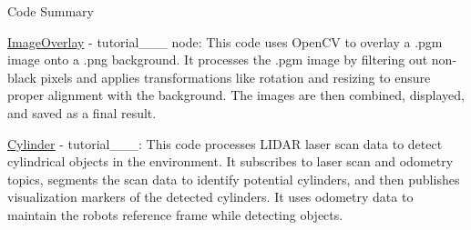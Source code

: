 Code Summary

\mbox{\hyperlink{classImageOverlay}{Image\+Overlay}} -\/ tutorial\+\_\+\_\+\_ node\+: This code uses Open\+CV to overlay a .pgm image onto a .png background. It processes the .pgm image by filtering out non-\/black pixels and applies transformations like rotation and resizing to ensure proper alignment with the background. The images are then combined, displayed, and saved as a final result.

\mbox{\hyperlink{classCylinder}{Cylinder}} -\/ tutorial\+\_\+\_\+\_\+: This code processes LIDAR laser scan data to detect cylindrical objects in the environment. It subscribes to laser scan and odometry topics, segments the scan data to identify potential cylinders, and then publishes visualization markers of the detected cylinders. It uses odometry data to maintain the robot\textquotesingle{}s reference frame while detecting objects. 